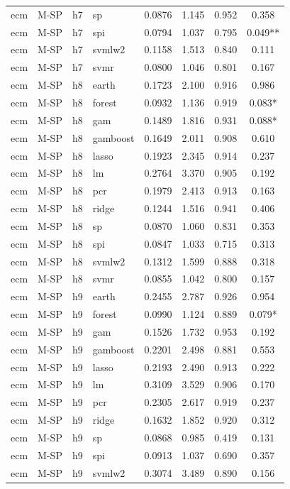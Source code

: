 \begin{ThreePartTable}
\begin{longtable}[t]{llclcccc}
ecm & M-SP & h7 & sp & 0.0876 & 1.145 & 0.952 & 0.358\\
ecm & M-SP & h7 & spi & 0.0794 & 1.037 & 0.795 & 0.049**\\
ecm & M-SP & h7 & svmlw2 & 0.1158 & 1.513 & 0.840 & 0.111\\
ecm & M-SP & h7 & svmr & 0.0800 & 1.046 & 0.801 & 0.167\\
\addlinespace
ecm & M-SP & h8 & earth & 0.1723 & 2.100 & 0.916 & 0.986\\
ecm & M-SP & h8 & forest & 0.0932 & 1.136 & 0.919 & 0.083*\\
ecm & M-SP & h8 & gam & 0.1489 & 1.816 & 0.931 & 0.088*\\
ecm & M-SP & h8 & gamboost & 0.1649 & 2.011 & 0.908 & 0.610\\
ecm & M-SP & h8 & lasso & 0.1923 & 2.345 & 0.914 & 0.237\\
ecm & M-SP & h8 & lm & 0.2764 & 3.370 & 0.905 & 0.192\\
ecm & M-SP & h8 & pcr & 0.1979 & 2.413 & 0.913 & 0.163\\
ecm & M-SP & h8 & ridge & 0.1244 & 1.516 & 0.941 & 0.406\\
ecm & M-SP & h8 & sp & 0.0870 & 1.060 & 0.831 & 0.353\\
ecm & M-SP & h8 & spi & 0.0847 & 1.033 & 0.715 & 0.313\\
ecm & M-SP & h8 & svmlw2 & 0.1312 & 1.599 & 0.888 & 0.318\\
ecm & M-SP & h8 & svmr & 0.0855 & 1.042 & 0.800 & 0.157\\
\addlinespace
ecm & M-SP & h9 & earth & 0.2455 & 2.787 & 0.926 & 0.954\\
ecm & M-SP & h9 & forest & 0.0990 & 1.124 & 0.889 & 0.079*\\
ecm & M-SP & h9 & gam & 0.1526 & 1.732 & 0.953 & 0.192\\
ecm & M-SP & h9 & gamboost & 0.2201 & 2.498 & 0.881 & 0.553\\
ecm & M-SP & h9 & lasso & 0.2193 & 2.490 & 0.913 & 0.222\\
ecm & M-SP & h9 & lm & 0.3109 & 3.529 & 0.906 & 0.170\\
ecm & M-SP & h9 & pcr & 0.2305 & 2.617 & 0.919 & 0.237\\
ecm & M-SP & h9 & ridge & 0.1632 & 1.852 & 0.920 & 0.312\\
ecm & M-SP & h9 & sp & 0.0868 & 0.985 & 0.419 & 0.131\\
ecm & M-SP & h9 & spi & 0.0913 & 1.037 & 0.690 & 0.357\\
ecm & M-SP & h9 & svmlw2 & 0.3074 & 3.489 & 0.890 & 0.156\\

\end{longtable}
\end{ThreePartTable}
